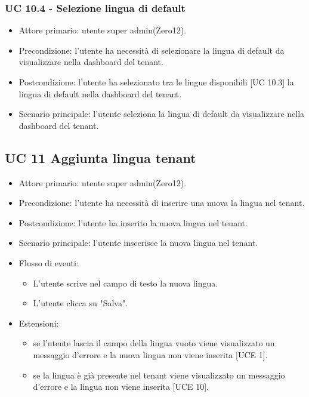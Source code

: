     \subsubsection{UC 10.4 - Selezione lingua di default}
        \begin{itemize}
            \item Attore primario: utente super admin(Zero12).
            \item Precondizione: l'utente ha necessità di selezionare la lingua di default da visualizzare nella dashboard del tenant.
            \item Postcondizione: l'utente ha selezionato tra le lingue disponibili [UC 10.3] la lingua di default nella dashboard del tenant.
            \item Scenario principale: l'utente seleziona la lingua di default da visualizzare nella dashboard del tenant.
        \end{itemize}
\subsection{UC 11 Aggiunta lingua tenant}
    \begin{itemize}
        \item Attore primario: utente super admin(Zero12).
        \item Precondizione: l'utente ha necessità di inserire una nuova la lingua nel tenant.
        \item Postcondizione: l'utente ha inserito la nuova lingua nel tenant.
        \item Scenario principale: l'utente inscerisce la nuova lingua nel tenant.
        \item Flusso di eventi:
            \begin{itemize}
                \item L'utente scrive nel campo di testo la nuova lingua.
                \item L'utente clicca su "Salva".
            \end{itemize}
        \item Estensioni:
            \begin{itemize}
                \item se l'utente lascia il campo della lingua vuoto viene visualizzato un messaggio d'errore e la nuova lingua non viene inserita [UCE 1].
                \item se la lingua è già presente nel tenant viene visualizzato un messaggio d'errore e la lingua non viene inserita [UCE 10].
            \end{itemize}
        \end{itemize}
